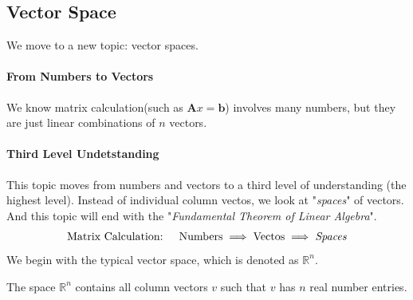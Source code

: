 \subsection{Vector Space}
We move to a new topic: vector spaces. 
\paragraph{From Numbers to Vectors} We know matrix calculation(such as $\bm Ax = \bm b$) involves many numbers, but they are just linear combinations of $n$ vectors.  
\paragraph{Third Level Undetstanding} This topic moves from numbers and vectors to a third level of understanding (the highest level). Instead of individual column vectos, we look at  "\textit{spaces}" of vectors. And this topic will end with the "\textit{Fundamental Theorem of Linear Algebra}".
\[\begin{array}{ll}
\mbox{Matrix Calculation: }
&
\mbox{Numbers}\implies
\mbox{Vectos}
\implies
\mbox{\emph{Spaces}}
\end{array}
\]
We begin with the typical vector space, which is denoted as $\mathbb{R}^{n}$.
\begin{definition}
The space $\mathbb{R}^{n}$ contains all column vectors $v$ such that $v$ has $n$ real number entries.
\end{definition}

